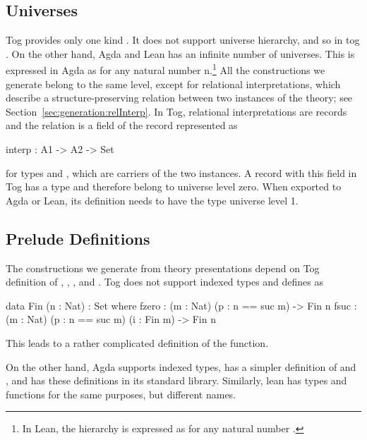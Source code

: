 \subsection{Universes}
Tog provides only one kind . It does not support universe hierarchy, and so in tog . On the other hand, Agda and Lean has an infinite number of universes. This is expressed in Agda as 
 for any natural number $\text{n}$.\footnote{In Lean, the hierarchy is expressed as  for any natural number .}
All the constructions we generate belong to the same level, except for relational interpretations, which describe a structure-preserving relation between two instances of the theory; see Section~\ref{sec:generation:relInterp}. In Tog, relational interpretations are records and the relation is a field of the record represented as 
\begin{togcode}
interp : A1 -> A2 -> Set
\end{togcode}
\noindent for types  and , which are carriers of the two instances. 
A record with this field in Tog has a type  and therefore belong to universe level zero. When exported to Agda or Lean, its definition needs to have the type universe level 1.  

\subsection{Prelude Definitions}
The constructions we generate from theory presentations depend on Tog definition of , , , and . Tog does not support indexed types and defines  as  
\begin{togcode}
data Fin (n : Nat) : Set where
  fzero : (m : Nat) (p : n == suc m) -> Fin n
  fsuc  : (m : Nat) (p : n == suc m) (i : Fin m) -> Fin n
\end{togcode}
\noindent This leads to a rather complicated definition of the  function. 

On the other hand, Agda supports indexed types, has a simpler definition of  and , and has these definitions in its standard library. Similarly, lean has types and functions for the same purposes, but different names.


